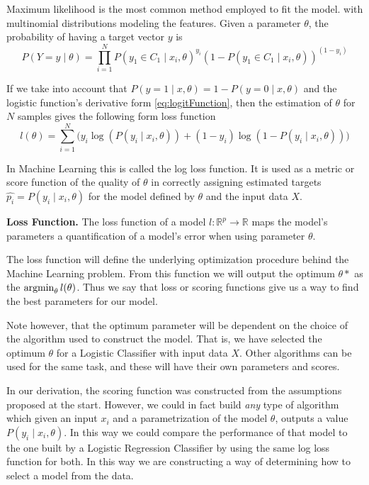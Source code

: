 Maximum likelihood is the most common method employed to fit the model.
with multinomial distributions modeling the features.
Given a parameter $\theta$, the probability of having a target vector $y$ is
\begin{equation}
P(Y =y \mid \theta ) = \prod_{i=1}^N {P(y_1 \in C_1 \mid x_i, \theta)}^{y_i} {(1 - P(y_1 \in C_1 \mid x_i, \theta) )}^{(1-y_i)}
\end{equation}

If we take into account that $P(y=1 \mid x,\theta) = 1 - P(y=0 \mid x,\theta)$ and the logistic function's derivative form \cref{eq:logitFunction}, then the estimation of $\theta$ for $N$ samples gives the following form
loss function
\begin{equation}\label{eq:logLossFunction}
l(\theta) = \sum_{i=1}^N \big(y_i \log(P(y_i \mid x_i,\theta)) + (1-y_i)\log(1 - P(y_i \mid x_i,\theta) ) \big)
\end{equation}

In Machine Learning this is called the log loss function.
It is used as a metric or score function of the quality of $\theta$ in correctly assigning estimated targets $ {\hat{p_i}} = P(y_i \mid x_i,\theta)$ for the model defined by $\theta$ and the input data $X$.


\begin{definition}{\textbf{Loss Function.}}
The loss function of a model $l: \mathbb{R}^{ p} \rightarrow  \mathbb{R} $ maps the model's parameters a quantification of a model's error when using parameter $\theta$.
\end{definition}

The loss function will define the underlying optimization procedure behind the Machine Learning problem.
From this function we will output the optimum $\theta*$ as the $\operatorname*{argmin}_{\theta} l(\theta) $.
Thus we say that loss or scoring functions give us a way to find the best parameters for our model.

Note however, that the optimum parameter will be dependent on the choice of the algorithm used to construct the model.
That is, we have selected the optimum $\theta$ for a Logistic Classifier with input data $X$.
Other algorithms can be used for the same task, and these will have their own parameters and scores.

In our derivation, the scoring function was constructed from the assumptions proposed at the start.
However, we could in fact build \textit{any} type of algorithm which given an input $x_i$ and a parametrization of the model $\theta$, outputs a value $P(y_i \mid x_i,\theta)$.
In this way we could compare the performance of that model to the one built by a Logistic Regression Classifier by using the same log loss function for both.
In this way we are constructing a way of determining how to select a model from the data.

